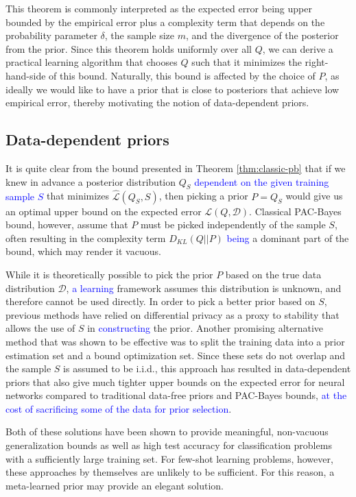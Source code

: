 \documentclass{article}
\theoremstyle{definition}
\newcommand{\LFe}[1]{\textcolor{blue}{#1}}
\begin{document}
This theorem is commonly interpreted as the expected error being upper bounded by the empirical error plus a complexity term that depends on the probability parameter $\delta$, the sample size $m$, and the divergence of the posterior from the prior. Since this theorem holds uniformly over all $Q$, we can derive a practical learning algorithm that chooses $Q$ such that it minimizes the right-hand-side of this bound. Naturally, this bound is affected by the choice of $P$, as ideally we would like to have a prior that is close to posteriors that achieve low empirical error, thereby motivating the notion of data-dependent priors.

\subsection{Data-dependent priors}

It is quite clear from the bound presented in Theorem \ref{thm:classic-pb} that if we knew in advance a posterior distribution $Q_S$ \LFe{dependent on the given training sample $S$} that minimizes $\hat{\mathcal{L}}(Q_S, S)$, then picking a prior $P=Q_S$ would give us an optimal upper bound on the expected error $\mathcal{L}(Q,\mathcal{D})$.
Classical PAC-Bayes bound, however, assume that $P$ must be picked independently of the sample $S$, often resulting in the complexity term $D_{KL}(Q||P)$ \LFe{being} a dominant part of the bound, which may render it vacuous. 

While it is theoretically possible to pick the prior $P$ based on the true data distribution $\mathcal{D}$, \LFe{a learning} framework assumes this distribution is unknown, and therefore  cannot be used directly. In order to pick a better prior based on $S$, previous methods have relied on differential privacy \citep{Dziugaite2018} as a proxy to stability that allows the use of $S$ in \LFe{constructing} the prior. Another promising alternative method that was shown to be effective \citep{Dziugaite2017, Perez-Ortiz2021} was to split the training data into a prior estimation set and a bound optimization set. Since these sets do not overlap and the sample $S$ is assumed to be i.i.d., this approach has resulted in data-dependent priors that also give much tighter upper bounds on the expected error for neural networks compared to traditional data-free priors and PAC-Bayes bounds, \LFe{at the cost of sacrificing some of the data for prior selection}.

Both of these solutions have been shown to provide meaningful, non-vacuous generalization bounds as well as high test accuracy for classification problems with a sufficiently large training set. For few-shot learning problems, however, these approaches by themselves are unlikely to be sufficient. For this reason, a meta-learned prior may provide an elegant solution.
\end{document}

